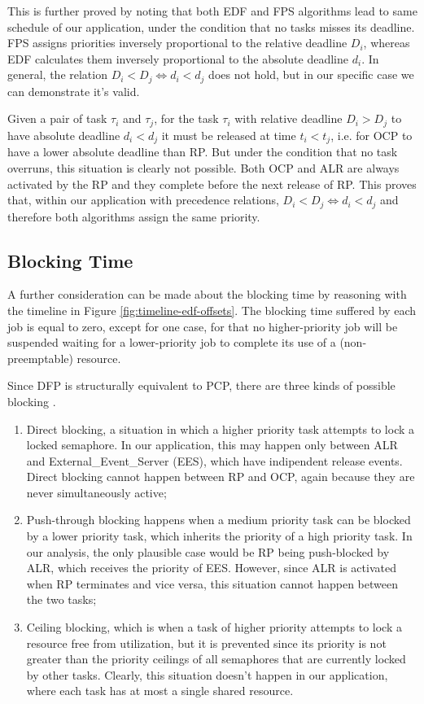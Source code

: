 \documentclass{article}
\begin{document}
This is further proved by noting that both EDF and FPS algorithms lead to same schedule of our application, under the condition that no tasks misses its deadline. FPS assigns priorities inversely proportional to the relative deadline $D_i$, whereas EDF calculates them inversely proportional to the absolute deadline $d_i$. In general, the relation $D_i < D_j \Leftrightarrow d_i < d_j$ does not hold, but in our specific case we can demonstrate it's valid.

Given a pair of task $\tau_i$ and $\tau_j$, for the task $\tau_i$ with relative deadline $D_i > D_j$ to have absolute deadline $d_i < d_j$ it must be released at time $t_i < t_j$, i.e. for OCP to have a lower absolute deadline than RP. But under the condition that no task overruns, this situation is clearly not possible. Both OCP and ALR are always activated by the RP and they complete before the next release of RP. This proves that, within our application with precedence relations, $D_i < D_j \Leftrightarrow d_i < d_j$ and therefore both algorithms assign the same priority.

\subsection{Blocking Time}\label{edf-blocking-time}
A further consideration can be made about the blocking time by reasoning with the timeline in Figure \ref{fig:timeline-edf-offsets}. The blocking time suffered by each job is equal to zero, except for one case, for that no higher-priority job will be suspended waiting for a lower-priority job to complete its use of a (non-preemptable) resource.

Since DFP is structurally equivalent to PCP, there are three kinds of possible blocking \cite{ada-pcp}.

\begin{enumerate}
   \item Direct blocking, a situation in which a higher priority task attempts to lock a locked semaphore. In our application, this may happen only between ALR and External\_Event\_Server (EES), which have indipendent release events. Direct blocking cannot happen between RP and OCP, again because they are never simultaneously active;
   \item Push-through blocking happens when a medium priority task can be blocked by a lower priority task, which inherits the priority of a high priority task. In our analysis, the only plausible case would be RP being push-blocked by ALR, which receives the priority of EES. However, since ALR is activated when RP terminates and vice versa, this situation cannot happen between the two tasks;
   \item Ceiling blocking, which is when a task of higher priority attempts to lock a resource free from utilization, but it is prevented since its priority is not greater than the priority ceilings of all semaphores that are currently locked by other tasks. Clearly, this situation doesn't happen in our application, where each task has at most a single shared resource.
\end{enumerate}
\end{document}

